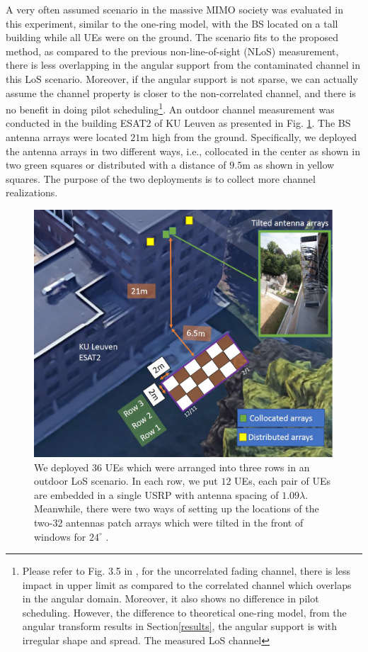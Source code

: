 A very often assumed scenario in the massive MIMO society was evaluated in this experiment, similar to the one-ring model\cite{bjornson2017massive}, with the BS located on a tall building while all UEs were on the ground. The scenario fits to the proposed method, as compared to the previous  non-line-of-sight (NLoS) measurement\cite{Chen2018pilot}, there is less overlapping in the angular support from the contaminated channel in this LoS scenario. Moreover, if the angular support is not sparse, we can actually assume the channel property is closer to the non-correlated channel, and there is no benefit in doing pilot scheduling\footnote{Please refer to Fig. 3.5 in \cite{bjornson2017massive}, for the uncorrelated fading channel,  there is less impact in upper limit as compared to the correlated channel which overlaps in the angular domain. Moreover, it also shows no difference in pilot scheduling. However, the difference to theoretical one-ring model, from the angular transform results in Section\ref{results}, the angular support is with irregular shape and spread. The measured LoS channel}.   An outdoor channel measurement was conducted in the building ESAT2 of KU Leuven as presented in Fig. \ref{fig:The measured outdoor scenario}. The BS antenna arrays were located $21$m high from the ground.  Specifically, we deployed the antenna arrays in two different ways, i.e., collocated in the center as shown in two green squares or distributed with a distance of $9.5$m as shown in yellow squares. The purpose of the two deployments is to collect more channel realizations. 


\begin{figure}[t!]
	\centering
	\includegraphics[width=1.0\linewidth]{figures/outdoor_scenario.jpg}
	\caption{We deployed $36$ UEs which were arranged into three rows in an outdoor LoS scenario. In each row, we put $12$ UEs, each pair of UEs are embedded in a single USRP with antenna spacing of $1.09\lambda$. Meanwhile, there were two ways of setting up the locations of the two-32 antennas patch arrays which were tilted in the front of windows for $24^\circ$ .}
	\label{fig:The measured outdoor scenario}
\end{figure}

